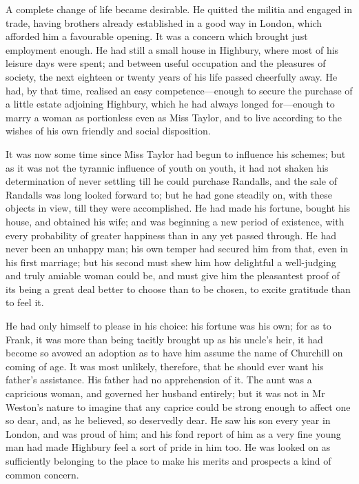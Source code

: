 A complete change of life became desirable. He quitted the militia and engaged in trade, having brothers already established in a good way in London, which afforded him a favourable opening. It was a concern which brought just employment enough. He had still a small house in Highbury, where most of his leisure days were spent; and between useful occupation and the pleasures of society, the next eighteen or twenty years of his life passed cheerfully away. He had, by that time, realised an easy competence—enough to secure the purchase of a little estate adjoining Highbury, which he had always longed for—enough to marry a woman as portionless even as Miss Taylor, and to live according to the wishes of his own friendly and social disposition.

It was now some time since Miss Taylor had begun to influence his schemes; but as it was not the tyrannic influence of youth on youth, it had not shaken his determination of never settling till he could purchase Randalls, and the sale of Randalls was long looked forward to; but he had gone steadily on, with these objects in view, till they were accomplished. He had made his fortune, bought his house, and obtained his wife; and was beginning a new period of existence, with every probability of greater happiness than in any yet passed through. He had never been an unhappy man; his own temper had secured him from that, even in his first marriage; but his second must shew him how delightful a well-judging and truly amiable woman could be, and must give him the pleasantest proof of its being a great deal better to choose than to be chosen, to excite gratitude than to feel it.

He had only himself to please in his choice: his fortune was his own; for as to Frank, it was more than being tacitly brought up as his uncle's heir, it had become so avowed an adoption as to have him assume the name of Churchill on coming of age. It was most unlikely, therefore, that he should ever want his father's assistance. His father had no apprehension of it. The aunt was a capricious woman, and governed her husband entirely; but it was not in Mr Weston's nature to imagine that any caprice could be strong enough to affect one so dear, and, as he believed, so deservedly dear. He saw his son every year in London, and was proud of him; and his fond report of him as a very fine young man had made Highbury feel a sort of pride in him too. He was looked on as sufficiently belonging to the place to make his merits and prospects a kind of common concern.

